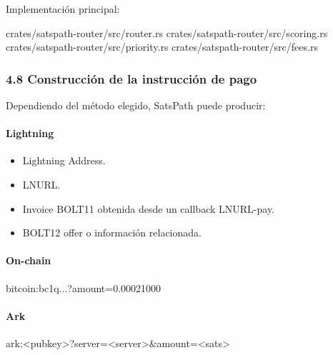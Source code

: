 \documentclass[
]{article}
\newenvironment{Shaded}{}{}
\newcommand{\NormalTok}[1]{#1}
\providecommand{\tightlist}{%
  \setlength{\itemsep}{0pt}\setlength{\parskip}{0pt}}
\begin{document}
Implementación principal:

\begin{Shaded}
\begin{Highlighting}[]
\NormalTok{crates/satspath{-}router/src/router.rs}
\NormalTok{crates/satspath{-}router/src/scoring.rs}
\NormalTok{crates/satspath{-}router/src/priority.rs}
\NormalTok{crates/satspath{-}router/src/fees.rs}
\end{Highlighting}
\end{Shaded}

\hypertarget{construcciuxf3n-de-la-instrucciuxf3n-de-pago}{%
\subsubsection{4.8 Construcción de la instrucción de
pago}\label{construcciuxf3n-de-la-instrucciuxf3n-de-pago}}

Dependiendo del método elegido, SatsPath puede producir:

\hypertarget{lightning}{%
\paragraph{Lightning}\label{lightning}}

\begin{itemize}
\tightlist
\item
  Lightning Address.
\item
  LNURL.
\item
  Invoice BOLT11 obtenida desde un callback LNURL-pay.
\item
  BOLT12 offer o información relacionada.
\end{itemize}

\hypertarget{on-chain}{%
\paragraph{On-chain}\label{on-chain}}

\begin{Shaded}
\begin{Highlighting}[]
\NormalTok{bitcoin:bc1q...?amount=0.00021000}
\end{Highlighting}
\end{Shaded}

\hypertarget{ark}{%
\paragraph{Ark}\label{ark}}

\begin{Shaded}
\begin{Highlighting}[]
\NormalTok{ark:\textless{}pubkey\textgreater{}?server=\textless{}server\textgreater{}\&amount=\textless{}sats\textgreater{}}
\end{Highlighting}
\end{Shaded}
\end{document}
